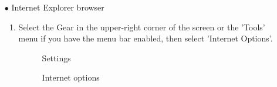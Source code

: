 \documentclass[14pt, a4paper]{article}
\begin{document}
\begin{enumerate}
\begin{enumerate}
  
\item[$\bullet$]  Internet Explorer browser
\begin{enumerate}
       \item Select the Gear in the upper-right corner of the screen or the 'Tools' menu if you have the menu bar enabled, then select 'Internet Options'.\\
        \begin{figure}[H]
       \centerline{}
		\caption{Settings}
      \end{figure}
  \begin{figure}[H]
       \centerline{}
		\caption{Internet options}
      \end{figure}      
      

\end{enumerate}
\end{enumerate}
\end{enumerate}
\end{document}

